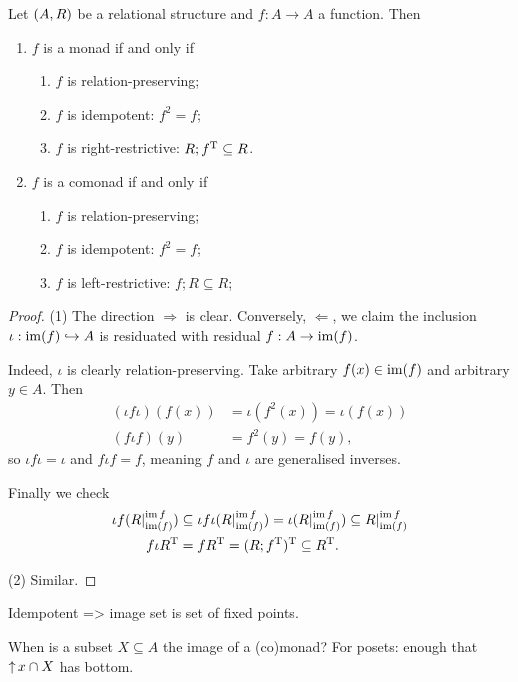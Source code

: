 \begin{lemma}
Let $\left( A,R \right)$ be a relational structure and $f: A \to A$ a function. Then
\begin{enumerate}
\item $f$ is a monad \textup{if and only if}
\begin{enumerate}
\item $f$ is relation-preserving;
\item $f$ is idempotent: $f^2 = f$;
\item $f$ is right-restrictive: $R;f^{\mathrm{T}} \subseteq R$.
\end{enumerate}
\item $f$ is a comonad \textup{if and only if}
\begin{enumerate}
\item $f$ is relation-preserving;
\item $f$ is idempotent: $f^2 = f$;
\item $f$ is left-restrictive: $f;R \subseteq R$;
\end{enumerate}
\end{enumerate}
\end{lemma}
\begin{proof}
(1) The direction $\Rightarrow$ is clear. Conversely, $\Leftarrow$, we claim the inclusion $\iota: \operatorname{im}(f) \hookrightarrow A$ is residuated with residual $f: A\to \operatorname{im}(f)$.

Indeed, $\iota$ is clearly relation-preserving. Take arbitrary $f(x)\in \operatorname{im}(f)$ and arbitrary $y\in A$. Then 
\begin{align*}
(\iota f \iota)(f(x)) &= \iota(f^2(x)) = \iota(f(x)) \\
(f \iota f)(y) &= f^2(y) = f(y),
\end{align*}
so $\iota f \iota = \iota$ and $f\iota f = f$, meaning $f$ and $\iota$ are generalised inverses.

Finally we check
\begin{align*}
\iota f (R|^{\operatorname{im} f}_{\operatorname{im}(f)}) &\subseteq \iota f \iota (R|^{\operatorname{im} f}_{\operatorname{im}(f)}) = \iota (R|^{\operatorname{im} f}_{\operatorname{im}(f)}) \subseteq R|^{\operatorname{im} f}_{\operatorname{im}(f)} \\
f \iota R^{\mathrm{T}} &= f R^{\mathrm{T}} = (R;f^{\mathrm{T}})^{\mathrm{T}} \subseteq R^{\mathrm{T}}.
\end{align*}

(2) Similar.
\end{proof}

Idempotent => image set is set of fixed points.

\begin{proposition}
When is a subset $X\subseteq A$ the image of a (co)monad? For posets: enough that $\operatorname{\uparrow} x \cap X$ has bottom.
\end{proposition}

